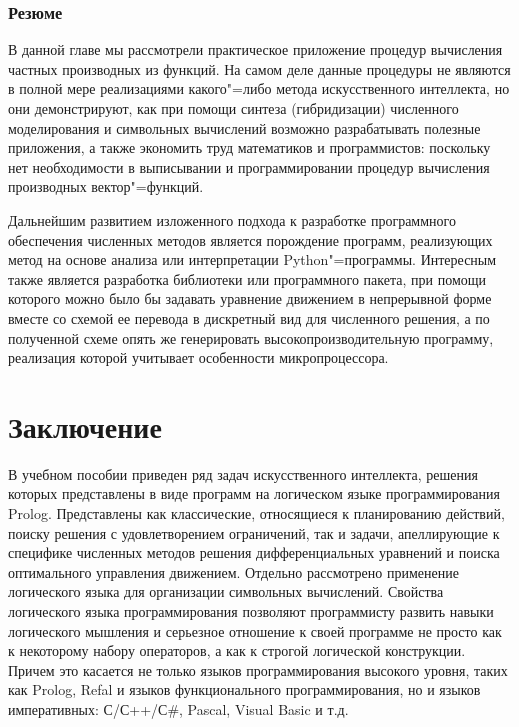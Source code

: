 \documentclass[a4paper,14pt, openany, twoside, draft]{extbook} %
\begin{document}
\subsection{Резюме}

В данной главе мы рассмотрели практическое приложение процедур вычисления частных производных из функций.  На самом деле данные процедуры не являются в полной мере реализациями какого"=либо метода искусственного интеллекта, но они демонстрируют, как при помощи синтеза (гибридизации) численного моделирования и символьных вычислений возможно разрабатывать полезные приложения, а также экономить труд математиков и программистов: поскольку нет необходимости в выписывании и программировании процедур вычисления производных вектор"=функций.

Дальнейшим развитием изложенного подхода к разработке программного обеспечения численных методов является порождение программ, реализующих метод на основе анализа или интерпретации Python"=программы.  Интересным также является разработка библиотеки или программного пакета, при помощи которого можно было бы задавать уравнение движением в непрерывной форме вместе со схемой ее перевода в дискретный вид для численного решения, а по полученной схеме опять же генерировать высокопроизводительную программу, реализация которой учитывает особенности микропроцессора.




\chapter*{Заключение}

В учебном пособии приведен ряд задач искусственного интеллекта, решения которых представлены в виде программ на логическом языке программирования Prolog.  Представлены как классические, относящиеся к планированию действий, поиску решения с удовлетворением ограничений, так и задачи, апеллирующие к специфике численных методов решения дифференциальных уравнений и поиска оптимального управления движением.  Отдельно рассмотрено применение логического языка для организации символьных вычислений.  Свойства логического языка программирования позволяют программисту развить навыки логического мышления и серьезное отношение к своей программе не просто как к некоторому набору операторов, а как к строгой логической конструкции.  Причем это касается не только языков программирования высокого уровня, таких как Prolog, Refal и языков функционального программирования, но и языков императивных: С/С++/С\#, Pascal, Visual Basic и т.д.
\end{document}
